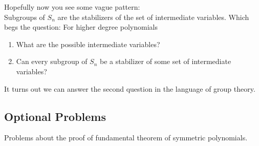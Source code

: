 \documentclass[reqno, 12pt, letter]{article}
\theoremstyle{plain}
\theoremstyle{definition}
\theoremstyle{remark}
\numberwithin{equation}{section}
\begin{document}
		Hopefully now you see some vague pattern:\\
		Subgroups of $ S_n$ are the stabilizers of the set of intermediate variables. Which begs the question: For higher degree polynomials 
		\begin{enumerate}
			\item 
		What are the possible intermediate variables? 
	\item Can every subgroup of $ S_n$ be a stabilizer of some set of intermediate variables?
		\end{enumerate}
		
		It turns out we can answer the second question in the language of group theory.
		
		\subsection{Optional Problems}
		Problems about the proof of fundamental theorem of symmetric polynomials.






\newpage
\theendnotes
\end{document}
